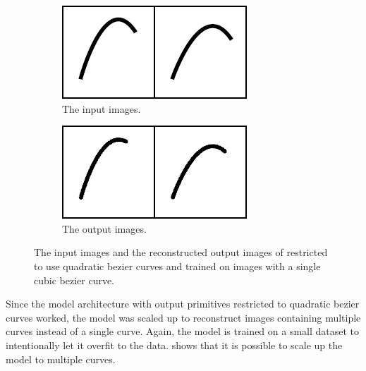 \begin{figure}
    \centering
    \begin{subfigure}{.45\textwidth}
        \includegraphics[width=\textwidth]{graphics/work-artifacts/im2vec/522/real_img_VectorVAEnLayers_6284.png}
        \caption{The input images.}
    \end{subfigure}
    \begin{subfigure}{.45\textwidth}
        \includegraphics[width=\textwidth]{graphics/work-artifacts/im2vec/522/recons_VectorVAEnLayers_6284.png}
        \caption{The output images.}
    \end{subfigure}
    \caption{The input images and the reconstructed output images of \citep{DBLP:conf/cvpr/Reddy21} restricted to use quadratic bezier curves and trained on images with a single cubic bezier curve.}
    \label{fig:522.recons}
\end{figure}

Since the model architecture with output primitives restricted to quadratic bezier curves worked, the model was scaled up to reconstruct images containing multiple curves instead of a single curve. Again, the model is trained on a small dataset to intentionally let it overfit to the data.  shows that it is possible to scale up the model to multiple curves.


